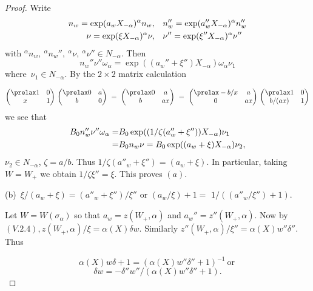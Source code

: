 \documentclass{memo-l}
\theoremstyle{definition}
\theoremstyle{remark}
\numberwithin{section}{chapter}
\numberwithin{equation}{chapter}
\begin{document}
\begin{proof}  Write 
$$
\aligned
n_{w} = \exp(a_{w}X_{-{\alpha}})^{{\alpha}}n_{w}, \quad & 
n_{w}'' = \exp(a_{w}''X_{-{\alpha}})^{{\alpha}}n_{w}'' \\
{\nu} = \exp({\xi}X_{-{\alpha}})^{{\alpha}}{\nu}, \quad &
{\nu}'' = \exp({\xi}''X_{-{\alpha}})^{{\alpha}}{\nu}''
\endaligned
$$
with ${}^{{\alpha}}n_{w},\ {}^{{\alpha}}n_{w}'',\ {}^{{\alpha}}{\nu},\
{}^{{\alpha}}{\nu}''  \in  N_{-{\alpha}}$.  Then 
$$
n_{w}''{\nu}''{\omega}_{{\alpha}} = 
\exp((a_{w}''+{\xi}'')X_{-{\alpha}}){\omega}_{{\alpha}}{\nu}_{1}
$$ 
where\ ${\nu}_{1}  \in  N_{-{\alpha}}$.  By the $2\times 2$ matrix calculation

\medpagebreak

$$
{\begin{pmatrix} \prelax  1 & 0 \\ x & 1 \end{pmatrix}}\
{\begin{pmatrix} \prelax  0 & a \\ b & 0 \end{pmatrix}}\ =\
{\begin{pmatrix} \prelax  
 0 & a \\ b & ax \end{pmatrix}}\ =\
{\begin{pmatrix} \prelax  
 -b/x & a \\ 0 & ax \end{pmatrix}}\
{\begin{pmatrix} \prelax  
 1 & 0 \\ b/(ax) & 1 \end{pmatrix}}
$$
\enddefinition
we see that $$\aligned 
B_{0}n''_{w}{\nu''}{\omega}_{{\alpha}} =&
B_{0}\exp((1/{\zeta}(a''_{w}+{\xi''}))X_{-{\alpha}}){\nu}_{1}\\
=& B_{0}n_{w}{\nu}
=  B_{0}\exp((a_{w}+{\xi})X_{-{\alpha}}){\nu}_{2},\endaligned$$ 
${\nu}_{2}  \in 
N_{-{\alpha}}$, ${\zeta} = a/b$.  Thus $1/{\zeta}(a''_{w}+{\xi''}) =
(a_{w}+{\xi})$.  In particular, taking $W = W_{+}$ we obtain $1/{\zeta}{\xi''}
= {\xi}$.  This proves $(a)$.

   (b)\  ${\xi}/(a_{w}+{\xi}) = (a''_{w}+{\xi''})/{\xi''}$ or $(a_{w}/{\xi}) + 1 =$
$1/((a''_{w}/{\xi''}) + 1).$

Let $W = W({\sigma}_{{\alpha}})$ so that $a_{w} = z(W_{+},{\alpha})$ and
$a_{w}'' = z''(W_{+},{\alpha})$.  Now by $(V.2.4), z(W_{+},{\alpha})/{\xi} =
{\alpha}(X){\delta}w$.  Similarly $z''(W_{+},{\alpha})/{\xi}'' =
{\alpha}(X)w''{\delta}''$.  Thus

$$
{\alpha}(X)w{\delta} + 1 = ({\alpha}(X)w''{\delta}'' + 1)^{-1}\  {\text{or}}\
$$
$$
{\delta}w = -{\delta}''w''/({\alpha}(X)w''{\delta}'' + 1) .
$$
\end{proof} 
\end{document}
